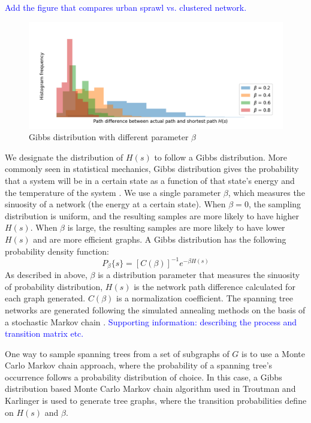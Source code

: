 \documentclass[draft]{agujournal2019}
\begin{document}
\textcolor{blue}{Add the figure that compares urban sprawl vs. clustered network.}

 \begin{figure}
 \noindent\includegraphics[width=\textwidth]{beta_vs_H.png}
\caption{Gibbs distribution with different parameter $\beta$}
\label{fig:beta}
\end{figure}

We designate the distribution of $H(s)$ to follow a Gibbs distribution. More commonly seen in statistical mechanics, Gibbs distribution gives the probability that a system will be in a certain state as a function of that state's energy and the temperature of the system \cite{}. We use a single parameter $\beta$, which measures the sinuosity of a network (the energy at a certain state). When $\beta=0$, the sampling distribution is uniform, and the resulting samples are more likely to have higher $H(s)$. When $\beta$ is large, the resulting samples are more likely to have lower $H(s)$ and are more efficient graphs. A Gibbs distribution has the following probability density function: \\
\[P_{\beta}\{s\} = [C(\beta)]^{-1} e^{-\beta H(s)}\]
As described in above, $\beta$ is a distribution parameter that measures the sinuosity of probability distribution, $H(s)$ is the network path difference calculated for each graph generated. $C(\beta)$ is a normalization coefficient. The spanning tree networks are generated following the simulated annealing methods on the basis of a stochastic Markov chain \cite{Aldous1987, Troutman1992,Seo2012}. \textcolor{blue}{Supporting information: describing the process and transition matrix etc.}

One way to sample spanning trees from a set of subgraphs of $G$ is to use a Monte Carlo Markov chain approach, where the probability of a spanning tree's occurrence follows a probability distribution of choice. In this case, a Gibbs distribution based Monte Carlo Markov chain algorithm used in Troutman and Karlinger  is used to generate tree graphs, where the transition probabilities define on $H(s)$ and $\beta$. 
\end{document}
